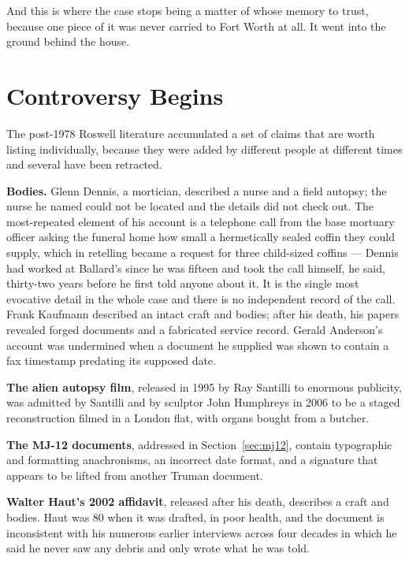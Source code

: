 And this is where the case stops being a matter of whose memory to trust, because one piece of it was
never carried to Fort Worth at all. It went into the ground behind the house.

\section{Controversy Begins}\label{sec:controversybegins}

The post-1978 Roswell literature accumulated a set of claims that are worth listing individually,
because they were added by different people at different times and several have been retracted.

\textbf{Bodies.} Glenn Dennis, a mortician, described a nurse and a field autopsy; the nurse he
named could not be located and the details did not check out. The most-repeated element of his
account is a telephone call from the base mortuary officer asking the funeral home how small a
hermetically sealed coffin they could supply, which in retelling became a request for three
child-sized coffins --- Dennis had worked at Ballard's since he was fifteen and took the call
himself, he said, thirty-two years before he first told anyone about it. It is the single most
evocative detail in the whole case and there is no independent record of the call. Frank Kaufmann described an intact
craft and bodies; after his death, his papers revealed forged documents and a fabricated service
record. Gerald Anderson's account was undermined when a document he supplied was shown to contain
a fax timestamp predating its supposed date.

\textbf{The alien autopsy film}, released in 1995 by Ray Santilli to enormous publicity, was
admitted by Santilli and by sculptor John Humphreys in 2006 to be a staged reconstruction filmed
in a London flat, with organs bought from a butcher.

\textbf{The MJ-12 documents}, addressed in Section~\ref{sec:mj12}, contain typographic and formatting
anachronisms, an incorrect date format, and a signature that appears to be lifted from another
Truman document.

\textbf{Walter Haut's 2002 affidavit}, released after his death, describes a craft and bodies. Haut
was 80 when it was drafted, in poor health, and the document is inconsistent with his numerous
earlier interviews across four decades in which he said he never saw any debris and only wrote
what he was told.

